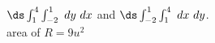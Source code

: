 {\noindent \begin{minipage}{\linewidth}
\end{minipage}
}
{$\ds \int_1^4\int_{-2}^1\ dy\ dx$ and $\ds\int_{-2}^1\int_1^4\ dx\ dy$.\\
area  of $R = 9u^2$
}
